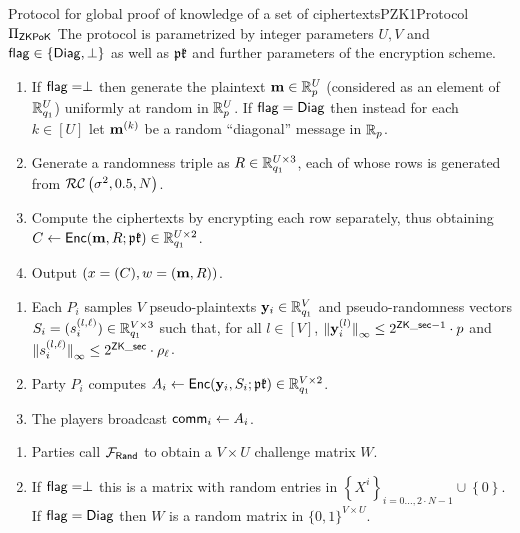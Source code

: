\begin{Boxfig}{Protocol for global proof of knowledge of a set of ciphertexts}{PZK1}{Protocol $\Pi_{\mathsf{ZKPoK}}$}
The protocol is parametrized by integer parameters $U,V$ and 
$\mathsf{flag}  \in \left\{ \mathsf{Diag}, \perp \right\}$ as well as $\mathfrak{pk}$ and further parameters of the encryption scheme.

\vspace{3mm}

\begin{enumerate}
\item If $\mathsf{flag}=\perp$ then generate the plaintext $\mathbf{m} \in \mathbb{R}_p^U$ (considered
  as an element of $\mathbb{R}_{q_1}^U$) uniformly at random in $\mathbb{R}_p^U$. If $\mathsf{flag}=\mathsf{Diag}$ then instead for each $k\in [U]$ let $\mathbf{m}^{(k)}$ be a random ``diagonal'' message in $\mathbb{R}_p$.
\item Generate a randomness triple as
$R \in \mathbb{R}_{q_1}^{U \times 3}$, each of whose rows is generated from $\mathcal{RC}\left( \sigma^2, 0.5, N \right)$.
\item Compute the ciphertexts by encrypting each row separately, thus obtaining
$C \leftarrow \mathsf{Enc}(\mathbf{m},R; \mathfrak{pk}) \in \mathbb{R}_{q_1}^{U \times 2}$.
\item Output $\left(x=(C),w=(\mathbf{m},R)\right)$.
\end{enumerate}

\vspace{3mm}

\begin{enumerate}
\item Each $P_i$ samples $V$ pseudo-plaintexts $\mathbf{y}_i \in \mathbb{R}_{q_1}^V$
  and pseudo-randomness vectors $S_i = (s_i^{(l,\ell)}) \in \mathbb{R}_{q_1}^{V \times 3}$ such that,
for all $l \in [V]$,
${\Vert \mathbf{y}_i^{(l)} \Vert}_\infty \le 2^{\mathsf{ZK\_sec}-1} \cdot p$
and
${\Vert s_i^{(l,\ell)} \Vert}_\infty \le 2^{\mathsf{ZK\_sec}} \cdot \rho_\ell$.
\item Party $P_i$ computes
  $A_i \leftarrow \mathsf{Enc}(\mathbf{y}_i,S_i; \mathfrak{pk}) \in \mathbb{R}_{q_1}^{V \times 2}$.
\item The players broadcast $\mathsf{comm}_i \leftarrow A_i$.
\end{enumerate}

\begin{enumerate}
  \item Parties call $\mathcal{F}_{\mathsf{Rand}}$ to obtain a $V \times U$ challenge matrix $W$.
  \item If $\mathsf{flag}=\perp$ this is a matrix with random entries in $\left\{ X^i \right\}_{i=0 \ldots, 2 \cdot N-1} \cup \left\{ 0 \right\}$. If $\mathsf{flag}=\mathsf{Diag}$ then $W$ is a random matrix in $\{0,1\}^{V\times U}$.
\end{enumerate}


\end{Boxfig}
